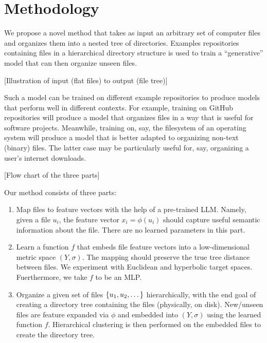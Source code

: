 \documentclass{article}
\begin{document}
\section{Methodology}

We propose a novel method that takes as input an arbitrary set of computer files and organizes them into a nested tree of directories. Examples repositories containing files in a hierarchical directory structure is used to train a ``generative'' model that can then organize unseen files.

  [Illustration of input (flat files) to output (file tree)]

Such a model can be trained on different example repositories to produce models that perform well in different contexts. For example, training on GitHub repositories will produce a model that organizes files in a way that is useful for software projects. Meanwhile, training on, say, the filesystem of an operating system will produce a model that is better adapted to organizing non-text (binary) files. The latter case may be particularly useful for, say, organizing a user's internet downloads.


  [Flow chart of the three parts]

Our method consists of three parts:

\begin{enumerate}
  \item Map files to feature vectors with the help of a pre-trained LLM. Namely, given a file $u_i$, the feature vector $x_i = \phi(u_i)$ should capture useful semantic information about the file. There are no learned parameters in this part.
  \item Learn a function $f$ that embeds file feature vectors into a low-dimensional metric space $(Y, \sigma)$. The mapping should preserve the true tree distance between files. We experiment with Euclidean and hyperbolic target spaces. Fuerthermore, we take $f$ to be an MLP.
  \item Organize a given set of files $\qty{u_1, u_2, \dots}$ hierarchically, with the end goal of creating a directory tree containing the files (physically, on disk). New/unseen files are feature expanded via $\phi$ and embedded into $(Y, \sigma)$ using the learned function $f$. Hierarchical clustering is then performed on the embedded files to create the directory tree.
\end{enumerate}
\end{document}
